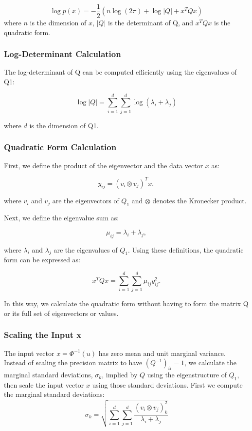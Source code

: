 \documentclass[journal=,manuscript=]{achemso}
\begin{document}
\[
\log p(x) = -\frac{1}{2} (n \log(2\pi) + \log|Q| + x^T Q x)
\] where \(n\) is the dimension of \(x\), \(|Q|\) is the determinant of
Q, and \(x^T Q x\) is the quadratic form.

\subsubsection{Log-Determinant
Calculation}\label{log-determinant-calculation}

The log-determinant of Q can be computed efficiently using the
eigenvalues of Q1:

\[
\log|Q| = \sum_{i=1}^d \sum_{j=1}^d \log(\lambda_i + \lambda_j)
\]

where \(d\) is the dimension of Q1.

\subsubsection{Quadratic Form
Calculation}\label{quadratic-form-calculation}

First, we define the product of the eigenvector and the data vector
\(x\) as:

\[
y_{ij} = (v_i \otimes v_j)^T x,
\]

where \(v_i\) and \(v_j\) are the eigenvectors of \(Q_1\) and
\(\otimes\) denotes the Kronecker product.

Next, we define the eigenvalue sum as:

\[
\mu_{ij} = \lambda_i + \lambda_j,
\]

where \(\lambda_i\) and \(\lambda_j\) are the eigenvalues of \(Q_1\).
Using these definitions, the quadratic form can be expressed as:

\[
x^T Q x = \sum_{i=1}^d \sum_{j=1}^d \mu_{ij} y_{ij}^2.
\]

In this way, we calculate the quadratic form without having to form the
matrix Q or its full set of eigenvectors or values.

\subsubsection{Scaling the Input x}\label{scaling-the-input-x}

The input vector \(x = \Phi^{-1}(u)\) has zero mean and unit marginal
variance. Instead of scaling the precision matrix to have
\((Q^{-1})_{ii} = 1\), we calculate the marginal standard deviations,
\(\sigma_k\), implied by \(Q\) using the eigenstructure of \(Q_1\), then
scale the input vector \(x\) using those standard deviations. First we
compute the marginal standard deviations: \[
\sigma_k = \sqrt{\sum_{i=1}^d \sum_{j=1}^d \frac{(v_i \otimes v_j)_k^2}{\lambda_i + \lambda_j}}
\]
\end{document}
